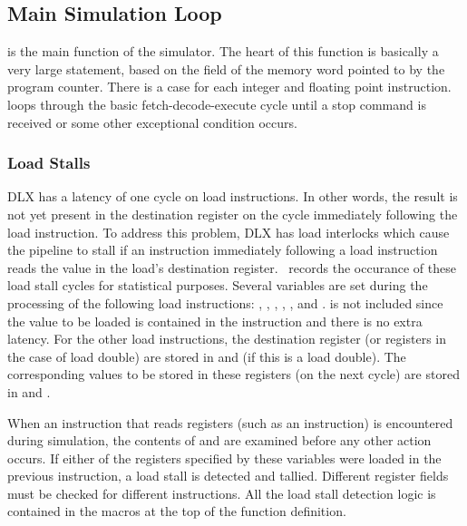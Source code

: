 \subsection{Main Simulation Loop}

 is the main function of the simulator.  The heart of this
function is basically a very large 
 statement, based on the  field of the memory
word pointed to by the program counter.  There is a case for each
integer and floating point instruction.   loops through the
basic fetch-decode-execute cycle until a stop command is received or some
other exceptional condition occurs.

\subsubsection{Load Stalls}

DLX has a latency of one cycle on load instructions.  In other words,
the result is not yet present in the destination register on the cycle
immediately following the load instruction.  To address this problem,
DLX has load interlocks which cause the pipeline to stall if an
instruction immediately following a load instruction reads the value
in the load's destination register.  \dlxsim\ records the occurance of
these load stall cycles for statistical purposes.  Several variables
are set during the processing of the following load instructions:
, , ,  , ,
and .   is not included since the value to be
loaded is contained in the instruction and there is no extra latency.
For the other load instructions, the destination register (or
registers in the case of load double) are stored in 
and  (if this is a load double).  The corresponding
values to be stored in these registers (on the next cycle) are stored
in  and .

When an instruction that reads registers (such as an 
instruction) is encountered during simulation, the contents of
 and  are examined before any other
action occurs.  If either of the registers specified by these
variables were loaded in the previous instruction, a load stall is
detected and tallied.  Different register fields must be checked for
different instructions.  All the load stall detection logic is
contained in the macros at the top of the  function
definition.

